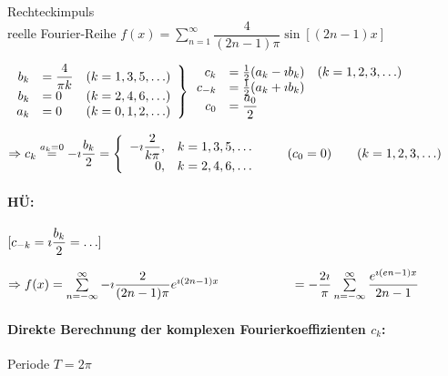 \Bsp Rechteckimpuls\\
reelle Fourier-Reihe $f(x)=\sum\limits_{n=1}^{\infty}\dfrac{4}{(2n-1)\pi}\sin[(2n-1)x]$

$\left.\begin{array}{rlc}
b_k&=\dfrac{4}{\pi k}&(k=1,3,5,\ldots)\\
b_k&=0&(k=2,4,6,\ldots)\\
a_k&=0&(k=0,1,2,\ldots)
\end{array}\right\}\begin{array}{rlc}
c_k&=\frac{1}{2}(a_k-\i b_k)&(k=1,2,3,\ldots)\\
c_{-k}&=\frac{1}{2}(a_k+\i b_k)\\
c_0&=\dfrac{a_0}{2}
\end{array}$

$\Rightarrow c_k\stackrel{a_k=0}{=}-\i\dfrac{b_k}{2}=\left\{\begin{array}{rl}
-\i\dfrac{2}{k\pi},&k=1,3,5,\ldots\\
0,&k=2,4,6,\ldots
\end{array}\right.\qquad(c_0=0)\qquad(k=1,2,3,\ldots)$

\paragraph{HÜ:} $[c_{-k}=\i\dfrac{b_k}{2}=\ldots]$

$\Rightarrow f(x)=\sum\limits_{n=-\infty}^{\infty}-\i\dfrac{2}{(2n-1)\pi}e^{\i(2n-1)x}\\
\hhspace{2cm}=-\dfrac{2\i}{\pi}\sum\limits_{n=-\infty}^{\infty}\dfrac{e^{\i(en-1)x}}{2n-1}$

\paragraph{Direkte Berechnung der komplexen Fourierkoeffizienten $c_k$:}\quad
\imgplaceholder Periode $T=2\pi$

